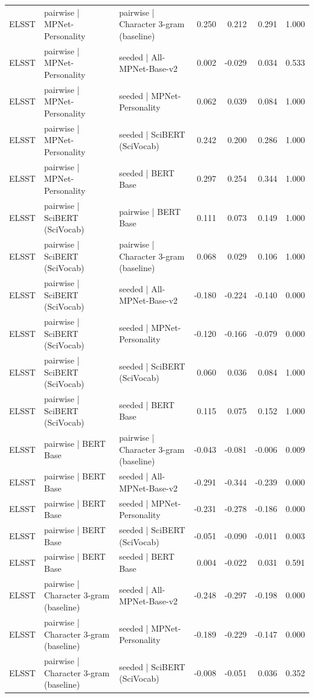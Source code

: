 \begin{table}[ht]
\begin{tabular}{lllrrrr}
ELSST & pairwise | MPNet-Personality & pairwise | Character 3-gram (baseline) & 0.250 & 0.212 & 0.291 & 1.000 \\
ELSST & pairwise | MPNet-Personality & seeded | All-MPNet-Base-v2 & 0.002 & -0.029 & 0.034 & 0.533 \\
ELSST & pairwise | MPNet-Personality & seeded | MPNet-Personality & 0.062 & 0.039 & 0.084 & 1.000 \\
ELSST & pairwise | MPNet-Personality & seeded | SciBERT (SciVocab) & 0.242 & 0.200 & 0.286 & 1.000 \\
ELSST & pairwise | MPNet-Personality & seeded | BERT Base & 0.297 & 0.254 & 0.344 & 1.000 \\
ELSST & pairwise | SciBERT (SciVocab) & pairwise | BERT Base & 0.111 & 0.073 & 0.149 & 1.000 \\
ELSST & pairwise | SciBERT (SciVocab) & pairwise | Character 3-gram (baseline) & 0.068 & 0.029 & 0.106 & 1.000 \\
ELSST & pairwise | SciBERT (SciVocab) & seeded | All-MPNet-Base-v2 & -0.180 & -0.224 & -0.140 & 0.000 \\
ELSST & pairwise | SciBERT (SciVocab) & seeded | MPNet-Personality & -0.120 & -0.166 & -0.079 & 0.000 \\
ELSST & pairwise | SciBERT (SciVocab) & seeded | SciBERT (SciVocab) & 0.060 & 0.036 & 0.084 & 1.000 \\
ELSST & pairwise | SciBERT (SciVocab) & seeded | BERT Base & 0.115 & 0.075 & 0.152 & 1.000 \\
ELSST & pairwise | BERT Base & pairwise | Character 3-gram (baseline) & -0.043 & -0.081 & -0.006 & 0.009 \\
ELSST & pairwise | BERT Base & seeded | All-MPNet-Base-v2 & -0.291 & -0.344 & -0.239 & 0.000 \\
ELSST & pairwise | BERT Base & seeded | MPNet-Personality & -0.231 & -0.278 & -0.186 & 0.000 \\
ELSST & pairwise | BERT Base & seeded | SciBERT (SciVocab) & -0.051 & -0.090 & -0.011 & 0.003 \\
ELSST & pairwise | BERT Base & seeded | BERT Base & 0.004 & -0.022 & 0.031 & 0.591 \\
ELSST & pairwise | Character 3-gram (baseline) & seeded | All-MPNet-Base-v2 & -0.248 & -0.297 & -0.198 & 0.000 \\
ELSST & pairwise | Character 3-gram (baseline) & seeded | MPNet-Personality & -0.189 & -0.229 & -0.147 & 0.000 \\
ELSST & pairwise | Character 3-gram (baseline) & seeded | SciBERT (SciVocab) & -0.008 & -0.051 & 0.036 & 0.352 \\

\end{tabular}
\end{table}
